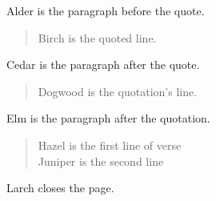 \documentclass{article}
\begin{document}
Alder is the paragraph before the quote.
\begin{quote}
Birch is the quoted line.
\end{quote}
Cedar is the paragraph after the quote.
\begin{quotation}
Dogwood is the quotation's line.
\end{quotation}
Elm is the paragraph after the quotation.
\begin{verse}
Hazel is the first line of verse\\
Juniper is the second line
\end{verse}
Larch closes the page.
\end{document}
